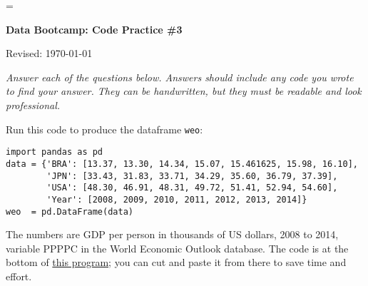 \documentclass[11pt]{exam}
\begin{document}
\parskip=\bigskipamount
\parindent=0.0in
\thispagestyle{empty}


\bigskip\bigskip
\centerline{\Large \bf Data Bootcamp:  Code Practice \#3}
\centerline{Revised: \today}

{\it Answer each of the questions below.
Answers should include any code you wrote to find your answer.
They can be handwritten, but they must be readable and look professional.}


Run this code to produce the dataframe \texttt{weo}:
\vspace{-0.15in}
\begin{verbatim}
import pandas as pd
data = {'BRA': [13.37, 13.30, 14.34, 15.07, 15.461625, 15.98, 16.10],
        'JPN': [33.43, 31.83, 33.71, 34.29, 35.60, 36.79, 37.39],
        'USA': [48.30, 46.91, 48.31, 49.72, 51.41, 52.94, 54.60],
        'Year': [2008, 2009, 2010, 2011, 2012, 2013, 2014]}
weo  = pd.DataFrame(data)
\end{verbatim}
\vspace{-0.15in}
The numbers are GDP per person in thousands of US dollars, 2008 to 2014,
variable PPPPC in the World Economic Outlook database.
The code is at the bottom of
\href{https://github.com/DaveBackus/Data_Bootcamp/blob/master/Code/Python/bootcamp_pandas_1.py}
{this program};
you can cut and paste it from there to save time and effort.
\end{document}
